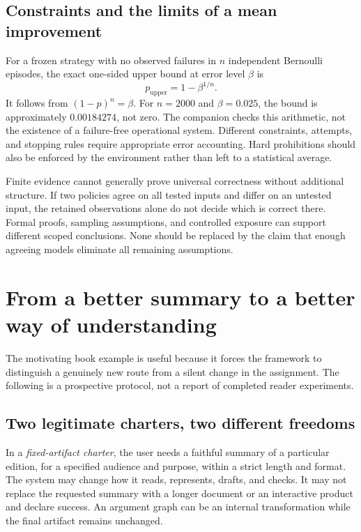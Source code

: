 \documentclass[11pt,letterpaper]{article}
\theoremstyle{remark}\newtheorem{remark}{Remark}[section]
\begin{document}
\subsection{Constraints and the limits of a mean improvement}
For a frozen strategy with no observed failures in $n$ independent Bernoulli episodes, the exact one-sided upper bound at error level $\beta$ is
\begin{equation}
p_{\mathrm{upper}}=1-\beta^{1/n}.
\label{eq:nofailures}
\end{equation}
It follows from $(1-p)^n=\beta$. For $n=2000$ and $\beta=0.025$, the bound is approximately $0.00184274$, not zero. The companion checks this arithmetic, not the existence of a failure-free operational system. Different constraints, attempts, and stopping rules require appropriate error accounting. Hard prohibitions should also be enforced by the environment rather than left to a statistical average.

Finite evidence cannot generally prove universal correctness without additional structure. If two policies agree on all tested inputs and differ on an untested input, the retained observations alone do not decide which is correct there. Formal proofs, sampling assumptions, and controlled exposure can support different scoped conclusions. None should be replaced by the claim that enough agreeing models eliminate all remaining assumptions.

\section{From a better summary to a better way of understanding}
\label{app:book}
The motivating book example is useful because it forces the framework to distinguish a genuinely new route from a silent change in the assignment. The following is a prospective protocol, not a report of completed reader experiments.

\subsection{Two legitimate charters, two different freedoms}
In a \emph{fixed-artifact charter}, the user needs a faithful summary of a particular edition, for a specified audience and purpose, within a strict length and format. The system may change how it reads, represents, drafts, and checks. It may not replace the requested summary with a longer document or an interactive product and declare success. An argument graph can be an internal transformation while the final artifact remains unchanged.
\end{document}
